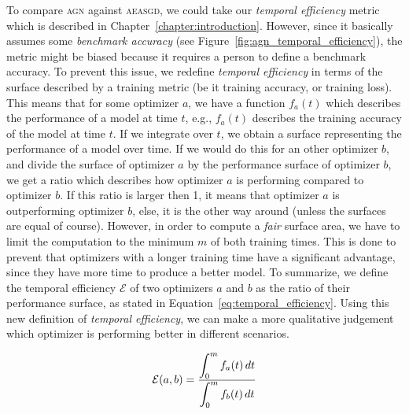 To compare \textsc{agn} against \textsc{aeasgd}, we could take our \emph{temporal efficiency} metric which is described in Chapter~\ref{chapter:introduction}. However, since it basically assumes some \emph{benchmark accuracy} (see Figure~\ref{fig:agn_temporal_efficiency}), the metric might be biased because it requires a person to define a benchmark accuracy. To prevent this issue, we redefine \emph{temporal efficiency} in terms of the surface described by a training metric (be it training accuracy, or training loss). This means that for some optimizer $a$, we have a function $f_a(t)$ which describes the performance of a model at time $t$, e.g., $f_a(t)$ describes the training accuracy of the model at time $t$. If we integrate over $t$, we obtain a surface representing the performance of a model over time. If we would do this for an other optimizer $b$, and divide the surface of optimizer $a$ by the performance surface of optimizer $b$, we get a ratio which describes how optimizer $a$ is performing compared to optimizer $b$. If this ratio is larger then 1, it means that optimizer $a$ is outperforming optimizer $b$, else, it is the other way around (unless the surfaces are equal of course). However, in order to compute a \emph{fair} surface area, we have to limit the computation to the minimum $m$ of both training times. This is done to prevent that optimizers with a longer training time have a significant advantage, since they have more time to produce a better model. To summarize, we define the temporal efficiency $\mathcal{E}$ of two optimizers $a$ and $b$ as the ratio of their performance surface, as stated in Equation~\ref{eq:temporal_efficiency}. Using this new definition of \emph{temporal efficiency}, we can make a more qualitative judgement which optimizer is performing better in different scenarios.

\begin{equation}
  \label{eq:temporal_efficiency}
  \mathcal{E}(a,b) = \frac{\displaystyle \int_0^m f_a(t) \,dt}{\displaystyle \int_0^m f_b(t) \,dt}
\end{equation}

